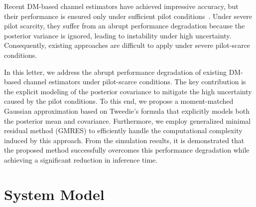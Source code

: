 \documentclass[lettersize,journal]{IEEEtran}
\begin{document}
Recent DM-based channel estimators have achieved impressive accuracy, but their performance is ensured only under sufficient pilot conditions~\cite{arvinteMIMOChannelEstimation2023,zhouGenerativeDiffusionModels2025}. Under severe pilot scarcity, they suffer from an abrupt performance degradation because the posterior variance is ignored, leading to instability under high uncertainty. Consequently, existing approaches are difficult to apply under severe pilot-scarce conditions.

In this letter, we address the abrupt performance degradation of existing DM-based channel estimators under pilot-scarce conditions. The key contribution is the explicit modeling of the posterior covariance to mitigate the high uncertainty caused by the pilot conditions. To this end, we propose a moment-matched Gaussian approximation based on Tweedie's formula that explicitly models both the posterior mean and covariance. Furthermore, we employ generalized minimal residual method (GMRES) to efficiently handle the computational complexity induced by this approach. From the simulation results, it is demonstrated that the proposed method successfully overcomes this performance degradation while achieving a significant reduction in inference time.

\section{System Model}
\end{document}
